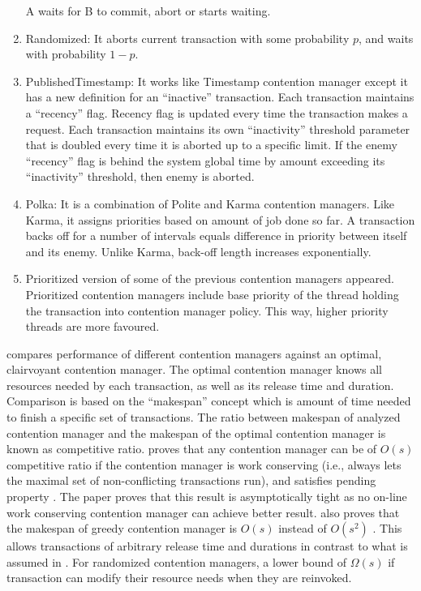 \documentclass[12pt,english]{report}
\begin{document}
\begin{enumerate}
A waits for B to commit, abort or starts waiting.
\item Randomized: It aborts current transaction with some probability $p$,
and waits with probability $1-p$.
\item PublishedTimestamp: It works like Timestamp contention manager except
it has a new definition for an {}``inactive'' transaction. Each
transaction maintains a {}``recency'' flag. Recency flag is updated
every time the transaction makes a request. Each transaction maintains
its own {}``inactivity'' threshold parameter that is doubled every
time it is aborted up to a specific limit. If the enemy {}``recency''
flag is behind the system global time by amount exceeding its {}``inactivity''
threshold, then enemy is aborted.
\item Polka: It is a combination of Polite and Karma contention managers.
Like Karma, it assigns priorities based on amount of job done so far.
A transaction backs off for a number of intervals equals difference
in priority between itself and its enemy. Unlike Karma, back-off length
increases exponentially.
\item Prioritized version of some of the previous contention managers appeared.
Prioritized contention managers include base priority of the thread
holding the transaction into contention manager policy. This way,
higher priority threads are more favoured.
\end{enumerate}
\cite{springerlink:10.1007/s00453-008-9195-x} compares performance
of different contention managers against an optimal, clairvoyant contention
manager. The optimal contention manager knows all resources needed
by each transaction, as well as its release time and duration. Comparison
is based on the {}``makespan'' concept which is amount of time needed
to finish a specific set of transactions. The ratio between makespan
of analyzed contention manager and the makespan of the optimal contention
manager is known as competitive ratio. \cite{springerlink:10.1007/s00453-008-9195-x}
proves that any contention manager can be of $O(s)$ competitive ratio
if the contention manager is work conserving (i.e., always lets the
maximal set of non-conflicting transactions run), and satisfies pending
property \cite{Guerraoui:2005:TTT:1073814.1073863}. The paper proves
that this result is asymptotically tight as no on-line work conserving
contention manager can achieve better result. \cite{springerlink:10.1007/s00453-008-9195-x}
also proves that the makespan of greedy contention manager is $O(s)$
instead of $O(s^{2})$ \cite{Guerraoui:2005:TTT:1073814.1073863}.
This allows transactions of arbitrary release time and durations in
contrast to what is assumed in \cite{Guerraoui:2005:TTT:1073814.1073863}.
For randomized contention managers, a lower bound of $\Omega(s)$
if transaction can modify their resource needs when they are reinvoked.
\end{document}
